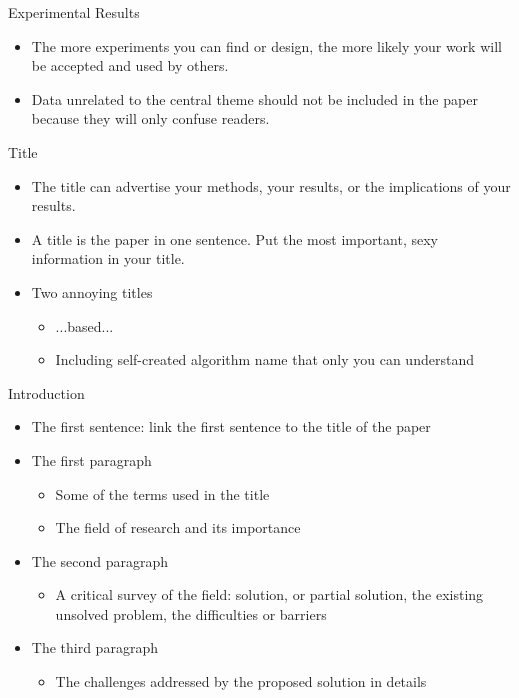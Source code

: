 \documentclass[
 size=14pt,
 paper=smartboard,  %
 mode=present, 		%
 display=slides, 	%
 style=tuliplab,  	%
 pauseslide,
 fleqn,leqno]{powerdot}{}
\begin{document}

\begin{slide}[toc=,bm=]{Experimental Results}
	\begin{itemize}
		\item The more experiments you can find or design, the more likely your work will be accepted and used by others.
		\item Data unrelated to the central theme should not be included in the paper because they will only confuse readers.
	\end{itemize}	
\end{slide}


\begin{slide}[toc=,bm=]{Title}
	\begin{itemize}
		\item The title can advertise your methods, your results, or the implications of your results.
		\item A title is the paper in one sentence. Put the most important, sexy information in your title. 
		\item Two annoying titles
			\begin{itemize}
				\item ...based...
				\item Including self-created algorithm name that only you can understand
			\end{itemize}
	\end{itemize}	
\end{slide}


\begin{slide}[toc=,bm=]{Introduction}
	\begin{itemize}
		\item The first sentence: link the first sentence to the title of the paper
		\item The first paragraph
			\begin{itemize}
				\item Some of the terms used in the title
				\item The field of research and its importance
			\end{itemize}
		\item The second paragraph
			\begin{itemize}
				\item A critical survey of the field: solution, or partial solution, the existing unsolved problem, the difficulties or barriers
			\end{itemize}
		\item The third paragraph
			\begin{itemize}
				\item The challenges addressed by the proposed solution in details
			\end{itemize}
	\end{itemize}	
\end{slide}
\end{document}
